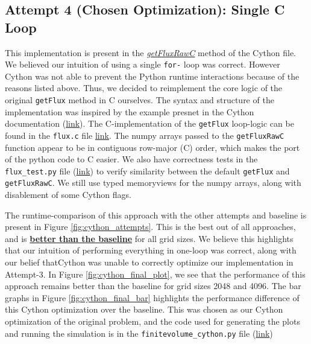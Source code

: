 \documentclass[a4paper,10pt]{article}
\begin{document}
\subsection{Attempt 4 (Chosen Optimization): Single \textbf{C} Loop}
This implementation is present in the \href{https://github.com/paulmyr/DD2358-HPC25/blob/master/10_project_rishi_paul/code/cython/finitevolume_cython_lib.pyx#L359}{\textit{getFluxRawC}} method of the Cython file. We believed our intuition of using a single \verb|for-| loop was correct. However Cython was not able to prevent the Python runtime interactions because of the reasons listed above. Thus, we decided to reimplement the core logic of the original \verb|getFlux| method in C ourselves. The syntax and structure of the implementation was inspired by the example presnet in the Cython documentation (\href{https://docs.cython.org/en/latest/src/userguide/memoryviews.html#pass-data-from-a-c-function-via-pointer}{link}). The C-implementation of the \verb|getFlux| loop-logic can be found in the \verb|flux.c| file \href{https://github.com/paulmyr/DD2358-HPC25/blob/master/10_project_rishi_paul/code/cython/flux.c}{link}. The numpy arrays passed to the \verb|getFluxRawC| function appear to be in contiguous row-major (C) order, which makes the port of the python code to C easier. We also have correctness tests in the \verb|flux_test.py| file (\href{https://github.com/paulmyr/DD2358-HPC25/blob/master/10_project_rishi_paul/code/cython/flux_test.py}{link}) to verify similarity between the default \verb|getFlux| and \verb|getFluxRawC|. We still use typed memoryviews for the numpy arrays, along with disablement of some Cython flags. 

The runtime-comparison of this approach with the other attempts and baseline is present in Figure \ref{fig:cython_attempts}. This is the best out of all approaches, and is \underline{\textbf{better than the baseline}} for all grid sizes. We believe this highlights that our intuition of performing everything in one-loop was correct, along with our belief thatCython was unable to correctly optimize our implementation in Attempt-3. In Figure \ref{fig:cython_final_plot}, we see that the performance of this approach remains better than the baseline for grid sizes 2048 and 4096. The bar graphs in Figure \ref{fig:cython_final_bar} highlights the performance difference of this Cython optimization over the baseline. This was chosen as our Cython optimization of the original problem, and the code used for generating the plots and running the simulation is in the \verb|finitevolume_cython.py| file (\href{https://github.com/paulmyr/DD2358-HPC25/blob/master/10_project_rishi_paul/code/cython/finitevolume_cython.py}{link})
\end{document}

